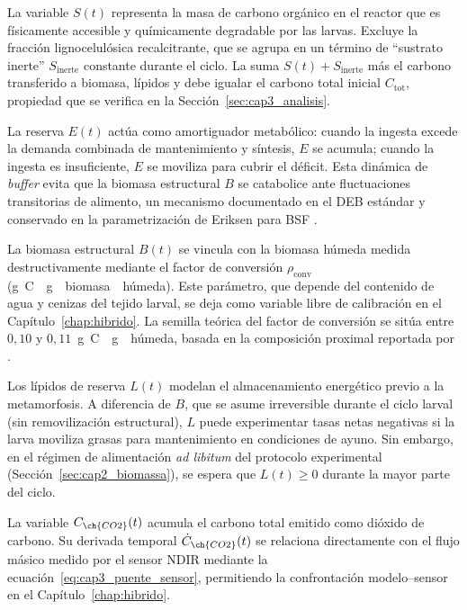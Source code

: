La variable $S(t)$ representa la masa de carbono orgánico en el reactor que es físicamente accesible y químicamente degradable por las larvas. Excluye la fracción lignocelulósica recalcitrante, que se agrupa en un término de ``sustrato inerte'' $S_{\mathrm{inerte}}$ constante durante el ciclo. La suma $S(t) + S_{\mathrm{inerte}}$ más el carbono transferido a biomasa, lípidos y  debe igualar el carbono total inicial $C_{\mathrm{tot}}$, propiedad que se verifica en la Sección~\ref{sec:cap3_analisis}.

La reserva $E(t)$ actúa como amortiguador metabólico: cuando la ingesta excede la demanda combinada de mantenimiento y síntesis, $E$ se acumula; cuando la ingesta es insuficiente, $E$ se moviliza para cubrir el déficit. Esta dinámica de \emph{buffer} evita que la biomasa estructural $B$ se catabolice ante fluctuaciones transitorias de alimento, un mecanismo documentado en el DEB estándar y conservado en la parametrización de Eriksen para BSF \parencite{eriksenDynamicModellingFeed2022}.

La biomasa estructural $B(t)$ se vincula con la biomasa húmeda medida destructivamente mediante el factor de conversión $\rho_{\mathrm{conv}}$ (\si{\gram C \per \gram\;biomasa\;húmeda}). Este parámetro, que depende del contenido de agua y cenizas del tejido larval, se deja como variable libre de calibración en el Capítulo~\ref{chap:hibrido}. La semilla teórica del factor de conversión se sitúa entre $0{,}10$ y $0{,}11$~\si{\gram C \per \gram\;húmeda}, basada en la composición proximal reportada por \textcite{nayakHermetiaIllucensDiptera2023}.

Los lípidos de reserva $L(t)$ modelan el almacenamiento energético previo a la metamorfosis. A diferencia de $B$, que se asume irreversible durante el ciclo larval (sin removilización estructural), $L$ puede experimentar tasas netas negativas si la larva moviliza grasas para mantenimiento en condiciones de ayuno. Sin embargo, en el régimen de alimentación \emph{ad libitum} del protocolo experimental (Sección~\ref{sec:cap2_biomassa}), se espera que $L(t) \geq 0$ durante la mayor parte del ciclo.

La variable $C_{\ch{CO2}}(t)$ acumula el carbono total emitido como dióxido de carbono. Su derivada temporal $\dot{C}_{\ch{CO2}}(t)$ se relaciona directamente con el flujo másico medido por el sensor NDIR mediante la ecuación~\eqref{eq:cap3_puente_sensor}, permitiendo la confrontación modelo--sensor en el Capítulo~\ref{chap:hibrido}.

